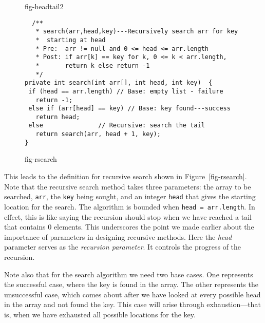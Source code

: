 \begin{figure}[htb]
 {fig-headtail2}
\end{figure}


\begin{figure}[tb]
\jjjprogstart
\begin{jjjlisting}
\begin{lstlisting}
  /**
   * search(arr,head,key)---Recursively search arr for key
   *  starting at head
   * Pre:  arr != null and 0 <= head <= arr.length
   * Post: if arr[k] == key for k, 0 <= k < arr.length, 
   *       return k else return -1
   */
private int search(int arr[], int head, int key)  {
 if (head == arr.length) // Base: empty list - failure
   return -1;
 else if (arr[head] == key) // Base: key found---success
   return head;
 else               // Recursive: search the tail
   return search(arr, head + 1, key);
}
\end{lstlisting}
\end{jjjlisting}
{fig-rsearch}
\end{figure}


This leads to the definition for recursive search shown in
Figure~\ref{fig-rsearch}.  Note that the recursive search method takes
three parameters: the array to be searched, {\tt arr}, the {\tt key}
being sought, and an integer {\tt head} that gives the starting
location for the search.   The algorithm is bounded when {\tt head =
arr.length}. In effect, this is like saying the recursion should stop
when we have reached a tail that contains 0 elements.  This underscores
the point we made earlier about the importance of parameters in
designing recursive methods.  Here the {\it head} parameter serves as
the {\em recursion parameter}. 
It controls the progress of the
recursion.

Note also that for the search algorithm we need two base cases.  One
represents the successful case, where the key is found in the array.
The other represents the unsuccessful case, which comes about after we
have looked at every possible head in the array and not found the
key.  This case will arise through exhaustion---that is, when we have
exhausted all possible locations for the key.

